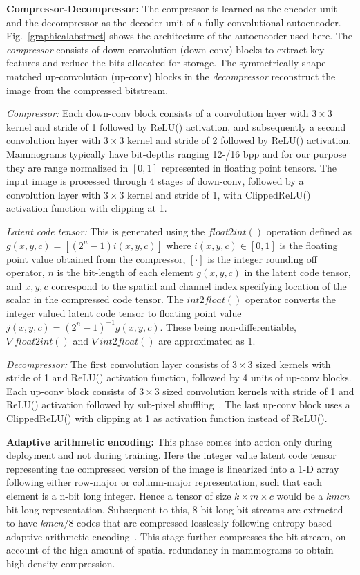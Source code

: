 \documentclass[10pt,twocolumn,letterpaper]{article}
\begin{document}
\textbf{Compressor-Decompressor:} The compressor is learned as the encoder unit and the decompressor as the decoder unit of a fully convolutional autoencoder. Fig.~\ref{graphicalabstract} shows the architecture of the autoencoder used here. The \emph{compressor} consists of down-convolution (down-conv) blocks to extract key features and reduce the bits allocated for storage. The symmetrically shape matched up-convolution (up-conv) blocks in the \emph{decompressor} reconstruct the image from the compressed bitstream. 

\emph{Compressor:} Each down-conv block consists of a convolution layer with $3\times3$ kernel and stride of 1 followed by ReLU() activation, and subsequently a second convolution layer with $3\times3$ kernel and stride of 2 followed by ReLU() activation. Mammograms typically have bit-depths ranging 12-/16 bpp and for our purpose they are range normalized in $[0,1]$ represented in floating point tensors. The input image is processed through 4 stages of down-conv, followed by a convolution layer with $3\times3$ kernel and stride of 1, with ClippedReLU() activation function with clipping at 1. 

\emph{Latent code tensor:} This is generated using the $float2int()$ operation defined as $g(x,y,c)=\left[(2^n-1)i(x,y,c)\right]$ where $i(x,y,c)\in[0,1]$ is the floating point value obtained from the compressor, $[\cdot]$ is the integer rounding off operator, $n$ is the bit-length of each element $g(x,y,c)$ in the latent code tensor, and $x,y,c$ correspond to the spatial and channel index specifying location of the scalar in the compressed code tensor. The $int2float()$ operator converts the integer valued latent code tensor to floating point value $j(x,y,c)=(2^n-1)^{-1}g(x,y,c)$. These being non-differentiable, $\nabla float2int()$ and $\nabla int2float()$ are approximated as 1.

\emph{Decompressor:} The first convolution layer consists of $3\times 3$ sized kernels with stride of 1 and ReLU() activation function, followed by 4 units of up-conv blocks. Each up-conv block consists of $3\times 3$ sized convolution kernels with stride of 1 and ReLU() activation followed by sub-pixel shuffling~\cite{shi2016real}. The last up-conv block uses a ClippedReLU() with clipping at 1 as activation function instead of ReLU().

\textbf{Adaptive arithmetic encoding:} This phase comes into action only during deployment and not during training. Here the integer value latent code tensor representing the compressed version of the image is linearized into a 1-D array following either row-major or column-major representation, such that each element is a n-bit long integer. Hence a tensor of size $k\times m \times c$ would be a $kmcn$ bit-long representation. Subsequent to this, 8-bit long bit streams are extracted to have $kmcn/8$ codes that are compressed losslessly following entropy based adaptive arithmetic encoding~\cite{witten1987arithmetic}. This stage further compresses the bit-stream, on account of the high amount of spatial redundancy in mammograms to obtain high-density compression.
\end{document}
